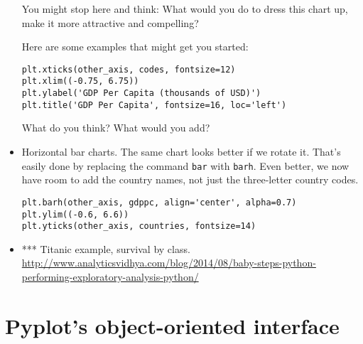 \documentclass[11pt]{article}
\begin{document}
\begin{itemize}
You might stop here and think:  What would you do to dress this chart up,
make it more attractive and compelling?

Here are some examples that might get you started:
\begin{verbatim}
plt.xticks(other_axis, codes, fontsize=12)
plt.xlim((-0.75, 6.75))
plt.ylabel('GDP Per Capita (thousands of USD)')
plt.title('GDP Per Capita', fontsize=16, loc='left')
\end{verbatim}
What do you think?  What would you add?

\item Horizontal bar charts.
The same chart looks better if we rotate it.
That's easily done by replacing the command {\tt bar} with {\tt barh}.
Even better, we now have room to add the country names, not just the three-letter
country codes.
\begin{verbatim}
plt.barh(other_axis, gdppc, align='center', alpha=0.7)
plt.ylim((-0.6, 6.6))
plt.yticks(other_axis, countries, fontsize=14)
\end{verbatim}

\item *** Titanic example, survival by class.  
\url{http://www.analyticsvidhya.com/blog/2014/08/baby-steps-python-performing-exploratory-analysis-python/} 

\end{itemize}



\section{Pyplot's object-oriented interface}
\end{document}
